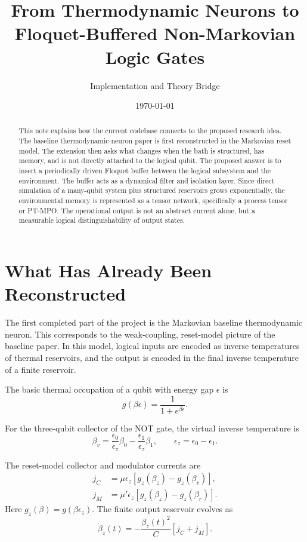 \documentclass[11pt]{article}
\title{From Thermodynamic Neurons to Floquet-Buffered Non-Markovian Logic Gates}
\author{Implementation and Theory Bridge}
\date{\today}
\begin{document}
\maketitle

\begin{abstract}
This note explains how the current codebase connects to the proposed research idea.  The
baseline thermodynamic-neuron paper is first reconstructed in the Markovian reset model.
The extension then asks what changes when the bath is structured, has memory, and is not
directly attached to the logical qubit.  The proposed answer is to insert a periodically driven
Floquet buffer between the logical subsystem and the environment.  The buffer acts as a
dynamical filter and isolation layer.  Since direct simulation of a many-qubit system plus
structured reservoirs grows exponentially, the environmental memory is represented as a
tensor network, specifically a process tensor or PT-MPO.  The operational output is not an
abstract current alone, but a measurable logical distinguishability of output states.
\end{abstract}

\section{What Has Already Been Reconstructed}

The first completed part of the project is the Markovian baseline thermodynamic neuron.
This corresponds to the weak-coupling, reset-model picture of the baseline paper.  In this
model, logical inputs are encoded as inverse temperatures of thermal reservoirs, and the
output is encoded in the final inverse temperature of a finite reservoir.

The basic thermal occupation of a qubit with energy gap $\epsilon$ is
\begin{equation}
    g(\beta \epsilon)
    =
    \frac{1}{1 + e^{\beta \epsilon}}.
\end{equation}

For the three-qubit collector of the NOT gate, the virtual inverse temperature is
\begin{equation}
    \beta_v
    =
    \frac{\epsilon_0}{\epsilon_z}\beta_0
    -
    \frac{\epsilon_1}{\epsilon_z}\beta_1,
    \qquad
    \epsilon_z = \epsilon_0 - \epsilon_1.
\end{equation}

The reset-model collector and modulator currents are
\begin{align}
    j_C
    &=
    \mu \epsilon_z
    \left[
        g_z(\beta_z) - g_z(\beta_v)
    \right],
    \\
    j_M
    &=
    \mu' \epsilon_z
    \left[
        g_z(\beta_z) - g_z(\beta_r)
    \right].
\end{align}
Here $g_z(\beta) = g(\beta \epsilon_z)$.  The finite output reservoir evolves as
\begin{equation}
    \dot{\beta}_z(t)
    =
    -
    \frac{\beta_z(t)^2}{C}
    \left[
        j_C + j_M
    \right].
\end{equation}
\end{document}

